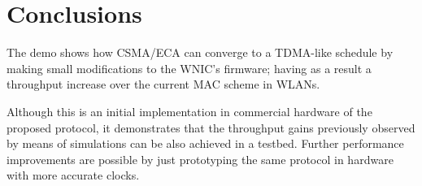 \documentclass[conference]{IEEEtran}
\begin{document}
\section{Conclusions}
The demo shows how CSMA/ECA can converge to a TDMA-like schedule by making small modifications to the WNIC's firmware; having as a result a throughput increase over the current MAC scheme in WLANs.

Although this is an initial implementation in commercial hardware of the proposed protocol, it demonstrates that the throughput gains previously observed by means of simulations can be also achieved in a testbed. Further performance improvements are possible by just prototyping the same protocol in hardware with more accurate clocks.




\end{document}
